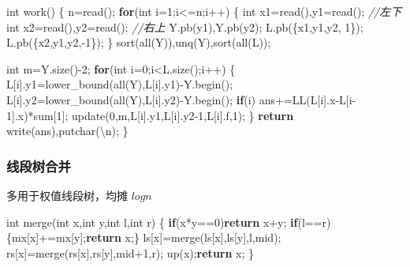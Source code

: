 \documentclass[
]{article}
\newenvironment{Shaded}{}{}
\newcommand{\CharTok}[1]{\textcolor[rgb]{0.25,0.44,0.63}{#1}}
\newcommand{\CommentTok}[1]{\textcolor[rgb]{0.38,0.63,0.69}{\textit{#1}}}
\newcommand{\ControlFlowTok}[1]{\textcolor[rgb]{0.00,0.44,0.13}{\textbf{#1}}}
\newcommand{\DataTypeTok}[1]{\textcolor[rgb]{0.56,0.13,0.00}{#1}}
\newcommand{\DecValTok}[1]{\textcolor[rgb]{0.25,0.63,0.44}{#1}}
\newcommand{\NormalTok}[1]{#1}
\newcommand{\SpecialCharTok}[1]{\textcolor[rgb]{0.25,0.44,0.63}{#1}}
\begin{document}
\begin{Shaded}
\begin{Highlighting}[]
\DataTypeTok{int}\NormalTok{ work()}
\NormalTok{\{}
\NormalTok{    n=read();}
    \ControlFlowTok{for}\NormalTok{(}\DataTypeTok{int}\NormalTok{ i=}\DecValTok{1}\NormalTok{;i\textless{}=n;i++)}
\NormalTok{    \{}
        \DataTypeTok{int}\NormalTok{ x1=read(),y1=read(); }\CommentTok{//左下}
        \DataTypeTok{int}\NormalTok{ x2=read(),y2=read(); }\CommentTok{//右上}
\NormalTok{        Y.pb(y1),Y.pb(y2);}
\NormalTok{        L.pb(\{x1,y1,y2, }\DecValTok{1}\NormalTok{\});}
\NormalTok{        L.pb(\{x2,y1,y2,{-}}\DecValTok{1}\NormalTok{\});}
\NormalTok{    \}}
\NormalTok{    sort(all(Y)),unq(Y),sort(all(L));}

    \DataTypeTok{int}\NormalTok{ m=Y.size(){-}}\DecValTok{2}\NormalTok{;}
    \ControlFlowTok{for}\NormalTok{(}\DataTypeTok{int}\NormalTok{ i=}\DecValTok{0}\NormalTok{;i\textless{}L.size();i++)}
\NormalTok{    \{}
\NormalTok{        L[i].y1=lower\_bound(all(Y),L[i].y1){-}Y.begin();}
\NormalTok{        L[i].y2=lower\_bound(all(Y),L[i].y2){-}Y.begin();}
        \ControlFlowTok{if}\NormalTok{(i) ans+=LL(L[i].x{-}L[i{-}}\DecValTok{1}\NormalTok{].x)*sum[}\DecValTok{1}\NormalTok{];}
\NormalTok{        update(}\DecValTok{0}\NormalTok{,m,L[i].y1,L[i].y2{-}}\DecValTok{1}\NormalTok{,L[i].f,}\DecValTok{1}\NormalTok{);}
\NormalTok{    \}}
    \ControlFlowTok{return}\NormalTok{ write(ans),putchar(}\CharTok{\textquotesingle{}}\SpecialCharTok{\textbackslash{}n}\CharTok{\textquotesingle{}}\NormalTok{);}
\NormalTok{\}}
\end{Highlighting}
\end{Shaded}

\hypertarget{ux7ebfux6bb5ux6811ux5408ux5e76}{%
\subsubsection{线段树合并}\label{ux7ebfux6bb5ux6811ux5408ux5e76}}

多用于权值线段树，均摊 \(logn\)

\begin{Shaded}
\begin{Highlighting}[]
\DataTypeTok{int}\NormalTok{ merge(}\DataTypeTok{int}\NormalTok{ x,}\DataTypeTok{int}\NormalTok{ y,}\DataTypeTok{int}\NormalTok{ l,}\DataTypeTok{int}\NormalTok{ r)}
\NormalTok{\{}
    \ControlFlowTok{if}\NormalTok{(x*y==}\DecValTok{0}\NormalTok{)}\ControlFlowTok{return}\NormalTok{ x+y; }
    \ControlFlowTok{if}\NormalTok{(l==r)\{mx[x]+=mx[y];}\ControlFlowTok{return}\NormalTok{ x;\}}
\NormalTok{    ls[x]=merge(ls[x],ls[y],l,mid);}
\NormalTok{    rs[x]=merge(rs[x],rs[y],mid+}\DecValTok{1}\NormalTok{,r);}
\NormalTok{    up(x);}\ControlFlowTok{return}\NormalTok{ x;}
\NormalTok{\}}
\end{Highlighting}
\end{Shaded}
\end{document}
